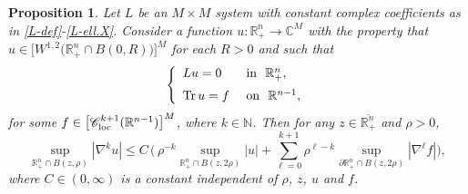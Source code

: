 \documentclass[11pt,reqno]{amsart}
\numberwithin{equation}{section}
\newtheorem{proposition}[theorem]{Proposition}
\theoremstyle{remark}
\begin{document}
\begin{proposition}\label{c1.2}
Let $L$ be an $M\times M$ system with constant complex coefficients as in \eqref{L-def}-\eqref{L-ell.X}.
Consider a function $u:{\mathbb{R}}^n_{+}\to{\mathbb{C}}^M$ with the property that 
$u\in\big[W^{1,2}\big({\mathbb{R}}^n_{+}\cap B(0,R)\big)\big]^M$ for each $R>0$ and such that
%
\begin{equation}\label{eJB-iY}
\left\{
\begin{array}{ll}
Lu=0 &\text{ in }\,\,\mathbb{R}^n_{+},
\\[6pt] 
{\rm Tr}\,u=f &\text{ on }\,\,\mathbb{R}^{n-1}, 
\end{array}
\right.
\end{equation}
%
for some $f\in\big[{\mathscr{C}}_{\rm loc}^{k+1}(\mathbb{R}^{n-1})\big]^M$,  
where $k\in{\mathbb{N}}$. Then for any $z\in\overline{\mathbb{R}^n_{+}}$ and $\rho>0$,
%
\begin{equation}\label{eq1.18}
\sup_{\mathbb{R}^n_{+}\cap B(z,\rho)}|\nabla^k u|\leq C\,\Big(\,\rho^{-k}\sup_{\mathbb{R}^n_{+}\cap B(z,2\rho)}|u|
+\sum_{\ell=0}^{k+1}\rho^{\ell-k}\sup_{\partial\mathbb{R}^n_{+}\cap B(z,2\rho)}|\nabla^\ell f|\Big),
\end{equation}
%
where $C\in(0,\infty)$ is a  constant independent of $\rho$, $z$, $u$ and $f$.
\end{proposition}
\end{document}

